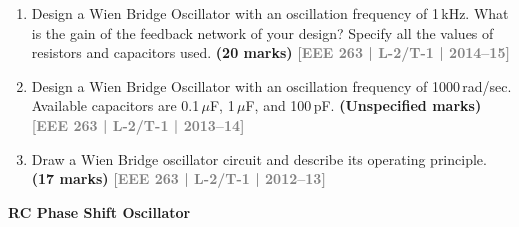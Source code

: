 \documentclass[12pt,a3paper]{article}
\newcommand{\yr}[1]{\hfill\textcolor{gray}{\small\textbf{[#1]}}}
\newcommand{\mk}[1]{\textcolor{orange!70!black}{\small\textbf{(#1 marks)}}}
\newcommand{\subtopic}[2]{%
  \vspace{10pt}
  \noindent\begin{tcolorbox}[colback=#1!8,colframe=#1,boxrule=0.6pt,arc=4pt,
    left=6pt,right=6pt,top=4pt,bottom=4pt]
    \small\bfseries\textcolor{#1}{#2}
  \end{tcolorbox}
  \vspace{2pt}
}
\begin{document}
\begin{enumerate}
\begin{center}
\begin{circuitikz}
    \draw (opamp.down) -- ++(0, -0.4) coordinate (vee);
    \filldraw (vee) circle (1.5pt) node[below] {-V};

    \coordinate (out_dot) at (8.5, 4);
    \draw (opamp.out) -- (out_dot);
    \filldraw (out_dot) circle (1.5pt);
    \draw (out_dot) to[short, -o] (10, 4) node[right] {V$_0$};

    \draw (out_dot) -- (8.5, 5.5) -- (0, 5.5) -- (NT);

    \draw (opamp.+) -| (NL);

    \draw (opamp.-) -| (NR);

    \filldraw (NT) circle (1.5pt);
    \filldraw (NB) circle (1.5pt);
    \filldraw (NL) circle (1.5pt);
    \filldraw (NR) circle (1.5pt);

\end{circuitikz}
\end{center}
\mk{28} \yr{EEE 263 | L-2/T-1 | Jan--2021}    
    
    
\item Design a Wien Bridge Oscillator with an oscillation frequency of 1\,kHz. What is the gain of the feedback network of your design? Specify all the values of resistors and capacitors used.
\mk{20} \yr{EEE 263 | L-2/T-1 | 2014--15}

\item Design a Wien Bridge Oscillator with an oscillation frequency of 1000\,rad/sec. Available capacitors are 0.1\,$\mu$F, 1\,$\mu$F, and 100\,pF.
\mk{Unspecified} \yr{EEE 263 | L-2/T-1 | 2013--14}

\item Draw a Wien Bridge oscillator circuit and describe its operating principle.
\mk{17} \yr{EEE 263 | L-2/T-1 | 2012--13}


\end{enumerate}

\subtopic{cF}{RC Phase Shift Oscillator}
\label{sub:s8-rcphase}
\end{document}
